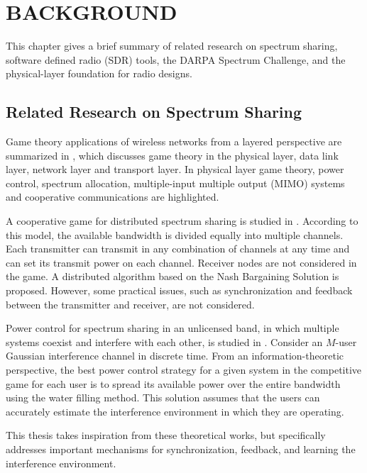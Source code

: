 
%
%

\chapter{BACKGROUND}
\label{chap:backgound}
This chapter gives a brief summary of related research on spectrum sharing, software defined radio (SDR) tools, the DARPA Spectrum Challenge, and the physical-layer foundation for radio designs.


\section{Related Research on Spectrum Sharing}

Game theory applications of wireless networks from a layered perspective are summarized in \cite{DimitrisECharilasAthanasiosDPanagopoulos:2010}, which discusses game theory in the physical layer, data link layer, network layer and transport layer. In physical layer game theory, power control, spectrum allocation, multiple-input multiple output (MIMO) systems and cooperative communications are highlighted.

A cooperative game for distributed spectrum sharing is studied in \cite {JuanESurisLuizADaSilvaZhuHanandAllenBMacKenzie2007}. According to this model, the available bandwidth is divided equally into multiple channels. Each transmitter can transmit in any combination of channels at any time and can set its transmit power on each channel. Receiver nodes are not considered in the game. A distributed algorithm based on the Nash Bargaining Solution is proposed. However, some practical issues, such as synchronization and feedback between the transmitter and receiver, are not considered.

Power control for spectrum sharing in an unlicensed band, in which multiple systems coexist and interfere with each other, is studied in \cite{REtkinandAParekhandDTse2007}. Consider an $M$-user Gaussian interference channel in discrete time. From an information-theoretic perspective, the best power control strategy for a given system in the competitive game for each user is to spread its available power over the entire bandwidth using the water filling method. This solution assumes that the users can accurately estimate the interference environment in which they are operating.

This thesis takes inspiration from these theoretical works, but specifically addresses important mechanisms for synchronization, feedback, and learning the interference environment.



